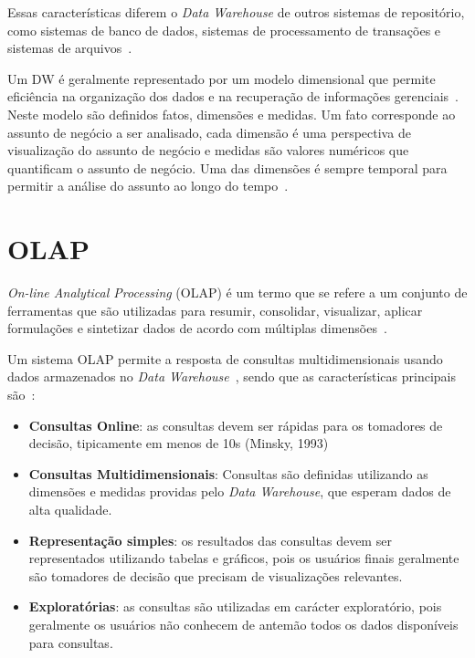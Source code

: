 Essas características diferem o \textit{Data Warehouse} de outros sistemas de repositório, como sistemas de banco de dados, sistemas de processamento de transações e sistemas de arquivos~\cite{silva:2015:abordagensParaCubo,bimonteOpenIssuesBig2016}.

Um DW é geralmente representado por um modelo dimensional que permite eficiência na organização dos dados e na recuperação de informações gerenciais~\cite{kimballDataWarehouseToolkit2013}.
Neste modelo são definidos fatos, dimensões e medidas.
Um fato corresponde ao assunto de negócio a ser analisado, cada dimensão é uma perspectiva de visualização do assunto de negócio e medidas são valores numéricos que quantificam o assunto de negócio.
Uma das dimensões é sempre temporal para permitir a análise do assunto ao longo do tempo~\cite{silva:2015:abordagensParaCubo}.

\section{OLAP}
\label{ch:fun:olap}

\textit{On-line Analytical Processing} (OLAP) é um termo que se refere a um conjunto de ferramentas que são utilizadas para resumir, consolidar, visualizar, aplicar formulações e sintetizar dados de acordo com múltiplas dimensões~\cite{coddProvidingOlapUseranalysts1998}.

Um sistema OLAP permite a resposta de consultas multidimensionais usando dados armazenados no \textit{Data Warehouse}~\cite{kimballDataWarehouseToolkit2013}, sendo que as características principais são~\cite{bimonteOpenIssuesBig2016}:

\begin{itemize}
	\item \textbf{Consultas Online}: as consultas devem ser rápidas para os tomadores de decisão, tipicamente em menos de 10s{\color{red} (Minsky, 1993)}
	\item \textbf{Consultas Multidimensionais}: Consultas são definidas utilizando as dimensões e medidas providas pelo \textit{Data Warehouse}, que esperam dados de alta qualidade.
	\item \textbf{Representação simples}: os resultados das consultas devem ser representados utilizando tabelas e gráficos, pois os usuários finais geralmente são tomadores de decisão que precisam de visualizações relevantes.
	\item \textbf{Exploratórias}: as consultas são utilizadas em carácter exploratório, pois geralmente os usuários não conhecem de antemão todos os dados disponíveis para consultas.
\end{itemize}

